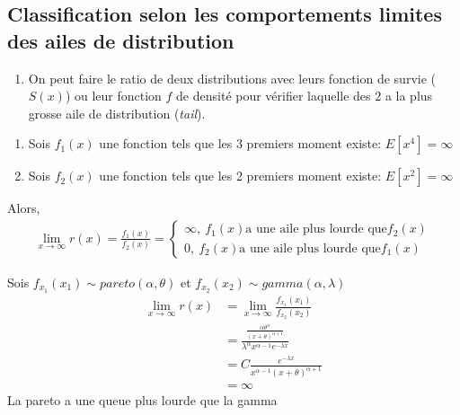 \documentclass[12pt, french]{report}
\begin{document}
\subsection{Classification selon les comportements limites des ailes de distribution}
\begin{enumerate}[label=\faAngleRight]
\item On peut faire le ratio de deux distributions avec leurs fonction de survie ($S(x)$) ou leur fonction $f$ de densité pour vérifier laquelle des 2 a la plus grosse aile de distribution (\textit{tail}).

\end{enumerate}

\begin{enumerate}
    \item Sois $f_1(x)$ une fonction tels que les 3 premiers moment existe: $E[x^4] = \infty$
    \item Sois $f_2(x)$ une fonction tels que les 2 premiers moment existe: $E[x^2] = \infty$
\end{enumerate}
Alors,
\begin{align*}
    \lim_{x\to\infty} r(x) = \frac{f_1(x)}{f_2(x)} = \left\{
                                                        \begin{array}{ll}
                                                            \infty ,\: f_1(x) \text{a une aile plus lourde que} f_2(x) \\
                                                            0      ,\: f_2(x) \text{a une aile plus lourde que} f_1(x) 
                                                        \end{array}
                                                    \right.
\end{align*}
\begin{exemple}
    Sois $f_{x_1}(x_1) \sim pareto(\alpha, \theta)$ et $f_{x_2}(x_2) \sim gamma(\alpha, \lambda)$ 
    \begin{align*}
        \lim_{x\to\infty} r(x) &= \lim_{x\to\infty} \frac{f_{x_1}(x_1)}{f_{x_2}(x_2)} \\
                               &= \frac{\frac{\alpha \theta^\alpha}{(x + \theta)^{\alpha + 1}}}{\lambda^\alpha x^{\alpha - 1} e^{-\lambda x}} \\
                               &= C \frac{e^{-\lambda x}}{x^{\alpha - 1} (x + \theta)^{\alpha + 1}} \\
                               &= \infty
    \end{align*}      
    La pareto a une queue plus lourde que la gamma
\end{exemple}
\end{document}
